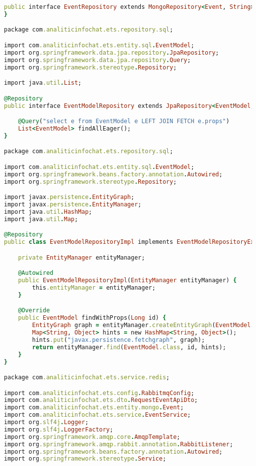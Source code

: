 \begin{lstlisting}[language=Ruby, style=rubystyle]
public interface EventRepository extends MongoRepository<Event, String> {
}

package com.analiticinfochat.ets.repository.sql;

import com.analiticinfochat.ets.entity.sql.EventModel;
import org.springframework.data.jpa.repository.JpaRepository;
import org.springframework.data.jpa.repository.Query;
import org.springframework.stereotype.Repository;

import java.util.List;

@Repository
public interface EventModelRepository extends JpaRepository<EventModel, Long>, EventModelRepositoryExtension {

    @Query("select e from EventModel e LEFT JOIN FETCH e.props")
    List<EventModel> findAllEager();
}

package com.analiticinfochat.ets.repository.sql;

import com.analiticinfochat.ets.entity.sql.EventModel;
import org.springframework.beans.factory.annotation.Autowired;
import org.springframework.stereotype.Repository;

import javax.persistence.EntityGraph;
import javax.persistence.EntityManager;
import java.util.HashMap;
import java.util.Map;

@Repository
public class EventModelRepositoryImpl implements EventModelRepositoryExtension {

    private EntityManager entityManager;

    @Autowired
    public EventModelRepositoryImpl(EntityManager entityManager) {
        this.entityManager = entityManager;
    }

    @Override
    public EventModel findWithProps(Long id) {
        EntityGraph graph = entityManager.createEntityGraph(EventModel.EVENT_MODEL_PROPS);
        Map<String, Object> hints = new HashMap<String, Object>();
        hints.put("javax.persistence.fetchgraph", graph);
        return entityManager.find(EventModel.class, id, hints);
    }
}

package com.analiticinfochat.ets.service.redis;

import com.analiticinfochat.ets.config.RabbitmqConfig;
import com.analiticinfochat.ets.dto.RequestEventApiDto;
import com.analiticinfochat.ets.entity.mongo.Event;
import com.analiticinfochat.ets.service.EventService;
import org.slf4j.Logger;
import org.slf4j.LoggerFactory;
import org.springframework.amqp.core.AmqpTemplate;
import org.springframework.amqp.rabbit.annotation.RabbitListener;
import org.springframework.beans.factory.annotation.Autowired;
import org.springframework.stereotype.Service;


\end{lstlisting}
